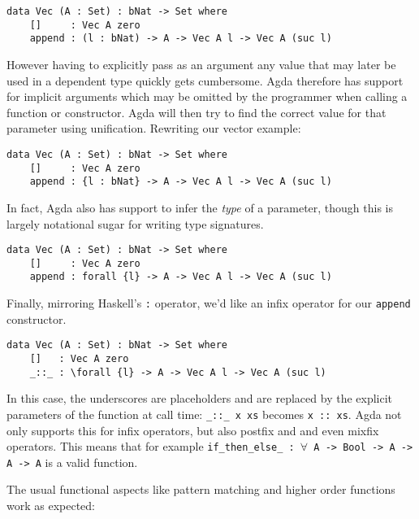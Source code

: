 \begin{lstlisting}[caption={A Simple Vector Type},label={lst:tutorial:vec}]
data Vec (A : Set) : bNat -> Set where
    []     : Vec A zero
    append : (l : bNat) -> A -> Vec A l -> Vec A (suc l)
\end{lstlisting}

However having to explicitly pass as an argument any value that may later be used in a dependent type quickly gets cumbersome. Agda therefore has support for implicit arguments which may be omitted by the programmer when calling a function or constructor. Agda will then try to find the correct value for that parameter using unification. Rewriting our vector example:

\begin{lstlisting}[caption={A Simple Vector Type, Take Two},label={lst:tutorial:vec:2}]
data Vec (A : Set) : bNat -> Set where
    []     : Vec A zero
    append : {l : bNat} -> A -> Vec A l -> Vec A (suc l)
\end{lstlisting}

In fact, Agda also has support to infer the \emph{type} of a parameter, though this is largely notational sugar for writing type signatures.

\begin{lstlisting}[caption={A Simple Vector Type, Take Three},label={lst:tutorial:vec:3}]
data Vec (A : Set) : bNat -> Set where
    []     : Vec A zero
    append : forall {l} -> A -> Vec A l -> Vec A (suc l)
\end{lstlisting}

Finally, mirroring Haskell's \texttt{:} operator, we'd like an infix operator for our \texttt{append} constructor.

\begin{lstlisting}[caption={A Simple Vector Type, Take Four},label={lst:tutorial:vec:4}]
data Vec (A : Set) : bNat -> Set where
    []   : Vec A zero
    _::_ : \forall {l} -> A -> Vec A l -> Vec A (suc l)
\end{lstlisting}

In this case, the underscores are placeholders and are replaced by the explicit parameters of the function at call time: \texttt{\_::\_ x xs} becomes \texttt{x :: xs}. Agda not only supports this for infix operators, but also postfix and and even mixfix operators. This means that for example \texttt{if\_then\_else\_ : $\forall$ {A} -> Bool -> A -> A -> A} is a valid function.

The usual functional aspects like pattern matching and higher order functions work as expected:

